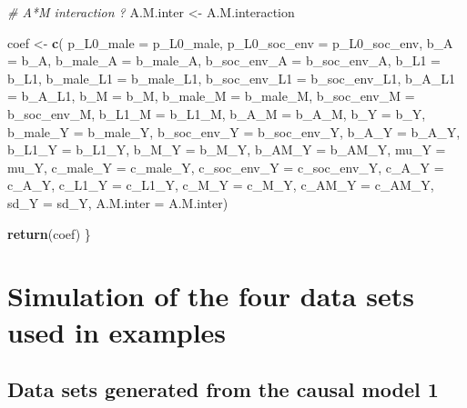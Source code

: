 \documentclass[
]{book}
\newenvironment{Shaded}{\begin{snugshade}}{\end{snugshade}}
\newcommand{\AttributeTok}[1]{\textcolor[rgb]{0.13,0.29,0.53}{#1}}
\newcommand{\CommentTok}[1]{\textcolor[rgb]{0.56,0.35,0.01}{\textit{#1}}}
\newcommand{\FunctionTok}[1]{\textcolor[rgb]{0.13,0.29,0.53}{\textbf{#1}}}
\newcommand{\NormalTok}[1]{#1}
\newcommand{\OtherTok}[1]{\textcolor[rgb]{0.56,0.35,0.01}{#1}}
\begin{document}
\begin{Shaded}
\begin{Highlighting}[]
\CommentTok{\# A*M interaction ?}
\NormalTok{A.M.inter }\OtherTok{\textless{}{-}}\NormalTok{ A.M.interaction}

\NormalTok{coef }\OtherTok{\textless{}{-}} \FunctionTok{c}\NormalTok{( }\AttributeTok{p\_L0\_male =}\NormalTok{ p\_L0\_male, }\AttributeTok{p\_L0\_soc\_env =}\NormalTok{ p\_L0\_soc\_env, }
           \AttributeTok{b\_A =}\NormalTok{ b\_A, }\AttributeTok{b\_male\_A =}\NormalTok{ b\_male\_A, }\AttributeTok{b\_soc\_env\_A =}\NormalTok{ b\_soc\_env\_A, }
           \AttributeTok{b\_L1 =}\NormalTok{ b\_L1, }\AttributeTok{b\_male\_L1 =}\NormalTok{ b\_male\_L1, }\AttributeTok{b\_soc\_env\_L1 =}\NormalTok{ b\_soc\_env\_L1, }
            \AttributeTok{b\_A\_L1 =}\NormalTok{ b\_A\_L1,}
           \AttributeTok{b\_M =}\NormalTok{ b\_M, }\AttributeTok{b\_male\_M =}\NormalTok{ b\_male\_M, }\AttributeTok{b\_soc\_env\_M =}\NormalTok{ b\_soc\_env\_M, }
            \AttributeTok{b\_L1\_M =}\NormalTok{ b\_L1\_M, }\AttributeTok{b\_A\_M =}\NormalTok{ b\_A\_M,}
           \AttributeTok{b\_Y =}\NormalTok{ b\_Y, }\AttributeTok{b\_male\_Y =}\NormalTok{ b\_male\_Y, }\AttributeTok{b\_soc\_env\_Y =}\NormalTok{ b\_soc\_env\_Y, }
            \AttributeTok{b\_A\_Y =}\NormalTok{ b\_A\_Y, }\AttributeTok{b\_L1\_Y =}\NormalTok{ b\_L1\_Y, }\AttributeTok{b\_M\_Y =}\NormalTok{ b\_M\_Y, }\AttributeTok{b\_AM\_Y =}\NormalTok{ b\_AM\_Y,}
           \AttributeTok{mu\_Y =}\NormalTok{ mu\_Y, }\AttributeTok{c\_male\_Y =}\NormalTok{ c\_male\_Y, }\AttributeTok{c\_soc\_env\_Y =}\NormalTok{ c\_soc\_env\_Y, }
            \AttributeTok{c\_A\_Y =}\NormalTok{ c\_A\_Y, }\AttributeTok{c\_L1\_Y =}\NormalTok{ c\_L1\_Y, }\AttributeTok{c\_M\_Y =}\NormalTok{ c\_M\_Y, }\AttributeTok{c\_AM\_Y =}\NormalTok{ c\_AM\_Y, }
              \AttributeTok{sd\_Y =}\NormalTok{ sd\_Y, }\AttributeTok{A.M.inter =}\NormalTok{ A.M.inter)}
  
  \FunctionTok{return}\NormalTok{(coef)}
\NormalTok{\}}
\end{Highlighting}
\end{Shaded}

\section{Simulation of the four data sets used in examples}\label{simulation-of-the-four-data-sets-used-in-examples}

\subsection{Data sets generated from the causal model 1}\label{data-sets-generated-from-the-causal-model-1}
\end{document}
